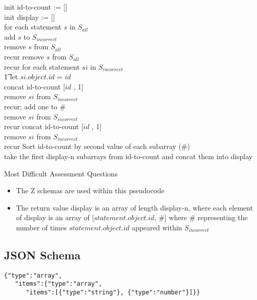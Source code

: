 \documentclass{article}
\begin{document}
\begin{algorithm}[H]

  \SetAlgoLined
  init id-to-count := [] \\
  init display := [] \\
   {
    for each statement $s$ in $S_{all}$ \\
    {
      add $s$ to $S_{incorrect}$ \\
      remove $s$ from $S_{all}$ \\
      recur
    }
    {
      remove $s$ from $S_{all}$ \\
      recur
    }}
   {
    for {each statement $si$ in $S_{incorrect}$} \\
    \t1 let $si.object.id$ = $id$ \\
    { concat id-to-count [$id$ , 1] \\
      remove $si$ from $S_{incorrect}$\\
      recur;}
    {
      { add one to \# \\
        remove $si$ from $S_{incorrect}$ \\
        recur}
      { concat id-to-count [$id$ , 1] \\
        remove $si$ from $S_{incorrect}$\\
        recur}
    }
  }
  Sort id-to-count by second value of each subarray (\#) \\
  take the first display-n subarrays from id-to-count and concat them into display
  \caption{Most Difficult Assessment Questions}
\end{algorithm}
\begin{itemize}
\item The Z schemas are used within this pseudocode
\item The return value display is an array of length display-n, where
  each element of display is an array of [$statement.object.id$, \#]
  where $\#$ representing the number of times $statement.object.id$
  appeared within $S_{incorrect}$
\end{itemize}

\subsection{JSON Schema}

\begin{lstlisting}[style=json]
{"type":"array",
   "items":{"type":"array",
      "items":[{"type":"string"}, {"type":"number"}]}}
\end{lstlisting}
\end{document}

